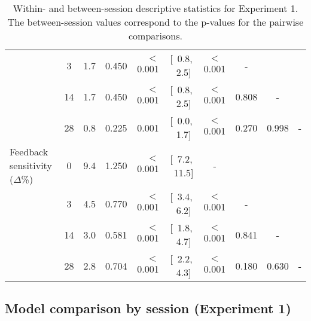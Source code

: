 \documentclass[a4paper,12pt]{article}
\begin{document}
\begin{refsection}[supp]
\begin{table}[h!]
\begin{adjustbox}{center}
\begin{tabular}{lcrrrccccc}
                                &  3   & 1.7 & 0.450 &  $<$0.001 & [\ 0.8, \ 2.5] & $<$0.001 & -     &       &   \\
                                & 14 & 1.7 & 0.450 &  $<$0.001 & [\ 0.8, \ 2.5] & $<$0.001 & 0.808 & -     &   \\
                                & 28 & 0.8 & 0.225 & 0.001 & [\ 0.0, \ 1.7] & $<$0.001 & 0.270 & 0.998 & - \\
        \midrule
        \footnotesize Feedback  sensitivity ($\Delta$\%) &  0 & 9.4 & 1.250 & $<$0.001 & [\ 7.2, \ 11.5] &        - &       &       &   \\
         &  3 & 4.5 & 0.770 & $<$0.001 & [\ 3.4, \ 6.2] & $<$0.001 & -     &       &   \\
                                          & 14 & 3.0 & 0.581 & $<$0.001 & [\ 1.8, \ 4.7] & $<$0.001 & 0.841 & -     &   \\
                                          & 28 & 2.8 & 0.704 & $<$0.001 & [\ 2.2, \ 4.3] & $<$0.001 & 0.180 & 0.630 & - \\
        \bottomrule
    \end{tabular}
    \end{adjustbox}
    \caption{Within- and between-session descriptive statistics for Experiment 1. The between-session values correspond to the p-values for the pairwise comparisons.}
    \label{tab:stats_exp01}
\end{table}

\clearpage
\subsection*{Model comparison by session (Experiment 1)}


\end{refsection}
\end{document}
